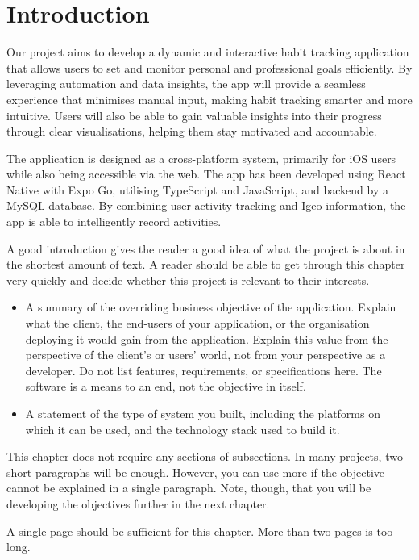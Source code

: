 \chapter{Introduction}
\label{chap:introduction}
Our project aims to develop a dynamic and interactive habit tracking application that allows users to set and monitor personal and professional goals efficiently. By leveraging automation and data insights, the app will provide a seamless experience that minimises manual input, making habit tracking smarter and more intuitive. Users will also be able to gain valuable insights into their progress through clear visualisations, helping them stay motivated and accountable.

The application is designed as a cross-platform system, primarily for iOS users while also being accessible via the web. The app has been developed using React Native with Expo Go, utilising TypeScript and JavaScript, and backend by a MySQL database. By combining user activity tracking and Igeo-information, the app is able to intelligently record activities.


\begin{expectations}
A good introduction gives the reader a good idea of what the project is about in the shortest amount of text.  A reader should be able to get through this chapter very quickly and decide whether this project is relevant to their interests.
\begin{itemize}
\item A summary of the overriding business objective of the application.  Explain what the client, the end-users of your application, or the organisation deploying it would gain from the application.  Explain this value from the perspective of the client's or users' world, not from your perspective as a developer.   Do not list features, requirements, or specifications here.  The software is a means to an end, not the objective in itself.
\item A statement of the type of system you built, including the platforms on which it can be used, and the technology stack used to build it.
\end{itemize}
This chapter does not require any sections of subsections.  In many projects, two short paragraphs will be enough.  However, you can use more if the objective cannot be explained in a single paragraph.  Note, though, that you will be developing the objectives further in the next chapter.
\end{expectations}

\begin{length}
A single page should be sufficient for this chapter.  More than two pages is too long.
\end{length}
